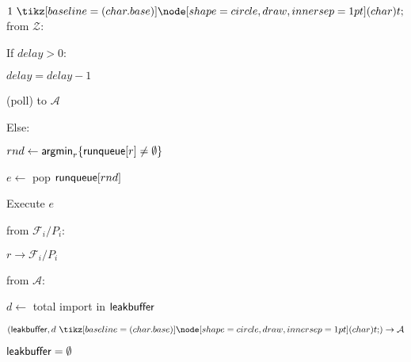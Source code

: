 \begin{bbox}[title={\textbf{Wrapper} $\mathcal{W}_{\msf{sync}}$}]
\OnInput {} $1 \token$ from $\mathcal{Z}$:
	\begin{ritemize}
	\item If $delay > 0$:
		\begin{renumerate}
		\item $delay = delay - 1$
		\item\Send (poll) to $\mathcal{A}$
		\end{renumerate}
	\item Else: 
		\begin{renumerate}
		\item $rnd \leftarrow {\mathsf {argmin}}_{r}\{ {\mathsf {runqueue}}[r] \neq \emptyset \}$
		\item $e \leftarrow$ pop ${\mathsf {runqueue}}[rnd]$
		\item Execute $e$
		\end{renumerate}
	\end{ritemize}
\OnInput {} from $\mathcal{F}_i/P_i$:
	\begin{renumerate}
	\item \Send $r \rightarrow \mathcal{F}_i/P_i$
	\end{renumerate}
\OnInput {} from $\mathcal{A}$:
	\begin{renumerate}
	\item $d \leftarrow$ total import in ${\mathsf {leakbuffer}}$
	\item \Send $(\msf{leakbuffer}, d \token) \rightarrow \mathcal{A}$
	\item ${\mathsf {leakbuffer}} = \emptyset$
	\end{renumerate}

\end{bbox}
